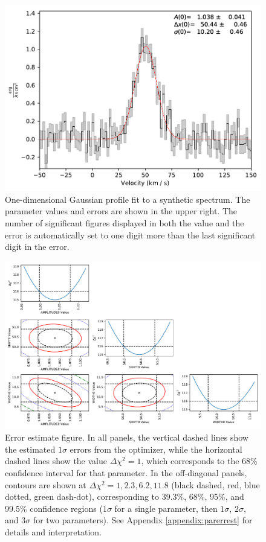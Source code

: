 \documentclass[twocolumn]{aastex63}
\begin{document}
\begin{figure}[!htp]
\includegraphics[scale=1,width=7in]{oned_gaussfit_example.pdf}
\caption{One-dimensional Gaussian profile fit to a synthetic spectrum.
The parameter values and errors are shown in the upper right.  The number of
significant figures displayed in both the value and the error is automatically
set to one digit more than the last significant digit in the error.}
\label{fig:synthspecdemo}
\end{figure}


\begin{figure}[!htp]
\includegraphics[scale=1,width=7in]{error_estimate_demonstration.pdf}
\caption{Error estimate figure.
In all panels, the vertical
dashed lines show the estimated $1\sigma$ errors from the optimizer, while the
horizontal dashed lines show the value $\Delta\chi^2=1$, which corresponds to
the 68\% confidence interval for that parameter.
In the off-diagonal panels, contours are shown at $\Delta\chi^2=1,2.3,6.2,11.8$ (black dashed, red, blue dotted, green dash-dot),
corresponding to 39.3\%, 68\%, 95\%, and 99.5\% confidence
regions ($1\sigma$ for a single parameter,
then $1\sigma$, $2\sigma$, and $3\sigma$ for two parameters).
See Appendix \ref{appendix:parerrest} for details and interpretation.}
\label{fig:parerrestdemo}
\end{figure}
\end{document}
